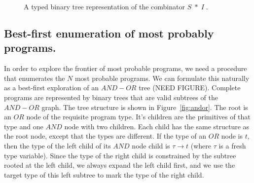 \documentclass{article}
\begin{document}
\begin{figure}
\begin{subfigure}[b]{0.2\linewidth}
 
    \end{subfigure}
  \caption{A typed binary tree representation of the combinator $S\;*\;I\;$.}
\end{figure}

\subsection{Best-first enumeration of most probably programs.}
In order to explore the frontier of most probable programs, we need a
procedure that enumerates the $N$ most probable programs. We can
formulate this naturally as a best-first exploration of an $AND-OR$
tree (NEED FIGURE). Complete programs are represented by binary trees
that are valid subtrees of the $AND-OR$ graph. The tree structure is
shown in Figure~\ref{fig:andor}. The root is an $OR$ node of the
requisite program type. It's children are the primitives of that type
and one $AND$ node with two children. Each child has the same
structure as the root node, except that the types are different. If
the type of an $OR$ node is $t$, then the type of the left child of
its $AND$ node child is $\tau \rightarrow t$ (where $\tau$ is a fresh
type variable). Since the type of the right child is constrained by
the subtree rooted at the left child, we always expand the left child
first, and we use the target type of this left subtree to mark the
type of the right child.
\end{document}
